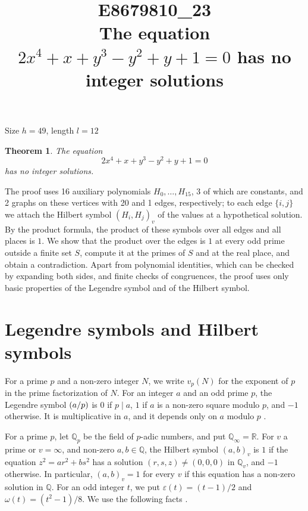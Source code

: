 \documentclass[11pt]{article}
\title{\textbf{E8679810\_23}\\[4pt] {\Large The equation $2x^{4}+x+y^{3}-y^{2}+y+1=0$ has no integer solutions}}
\author{}
\date{}
\newtheorem{theorem}{Theorem}
\newcommand{\Q}{\mathbb{Q}}
\newcommand{\leg}[2]{\mathchoice{\biggl(\dfrac{#1}{#2}\biggr)}{(#1/#2)}{(#1/#2)}{(#1/#2)}}
\begin{document}
\maketitle
\vspace{-8ex}
\begin{center}
Size $h=49$, length $l=12$
\end{center}

\begin{theorem}\label{thm:main}
The equation
\begin{equation}\label{eq:main}
2x^{4}+x+y^{3}-y^{2}+y+1=0
\end{equation}
has no integer solutions.
\end{theorem}

The proof uses 16 auxiliary polynomials $H_0,\dots,H_{15}$, 3 of which are constants, and 2 graphs on these vertices with 20 and 1 edges, respectively; to each edge $\{i,j\}$ we attach the Hilbert symbol $(H_i,H_j)_v$ of the values at a hypothetical solution. By the product formula, the product of these symbols over all edges and all places is $1$. We show that the product over the edges is $1$ at every odd prime outside a finite set $S$, compute it at the primes of $S$ and at the real place, and obtain a contradiction. Apart from polynomial identities, which can be checked by expanding both sides, and finite checks of congruences, the proof uses only basic properties of the Legendre symbol and of the Hilbert symbol.

\section{Legendre symbols and Hilbert symbols}

For a prime $p$ and a non-zero integer $N$, we write $v_p(N)$ for the exponent of $p$ in the prime factorization of $N$. For an integer $a$ and an odd prime $p$, the Legendre symbol $\leg{a}{p}$ is $0$ if $p\mid a$, $1$ if $a$ is a non-zero square modulo $p$, and $-1$ otherwise. It is multiplicative in $a$, and it depends only on $a$ modulo $p$ \cite[Chapter~5]{IR}.

For a prime $p$, let $\Q_p$ be the field of $p$-adic numbers, and put $\Q_\infty=\mathbb R$. For $v$ a prime or $v=\infty$, and non-zero $a,b\in\Q$, the Hilbert symbol $(a,b)_v$ is $1$ if the equation $z^2=ar^2+bs^2$ has a solution $(r,s,z)\neq(0,0,0)$ in $\Q_v$, and $-1$ otherwise. In particular, $(a,b)_v=1$ for every $v$ if this equation has a non-zero solution in $\Q$. For an odd integer $t$, we put $\varepsilon(t)=(t-1)/2$ and $\omega(t)=(t^2-1)/8$. We use the following facts \cite[Chapter~III, Proposition~2 and Theorems~1 and~3]{Se}.
\end{document}
